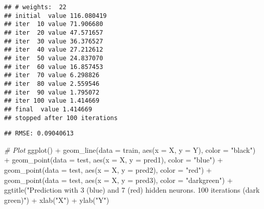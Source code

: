 \documentclass[
]{article}
\newenvironment{Shaded}{\begin{snugshade}}{\end{snugshade}}
\newcommand{\AttributeTok}[1]{\textcolor[rgb]{0.77,0.63,0.00}{#1}}
\newcommand{\CommentTok}[1]{\textcolor[rgb]{0.56,0.35,0.01}{\textit{#1}}}
\newcommand{\DecValTok}[1]{\textcolor[rgb]{0.00,0.00,0.81}{#1}}
\newcommand{\FunctionTok}[1]{\textcolor[rgb]{0.00,0.00,0.00}{#1}}
\newcommand{\NormalTok}[1]{#1}
\newcommand{\OtherTok}[1]{\textcolor[rgb]{0.56,0.35,0.01}{#1}}
\newcommand{\SpecialCharTok}[1]{\textcolor[rgb]{0.00,0.00,0.00}{#1}}
\newcommand{\StringTok}[1]{\textcolor[rgb]{0.31,0.60,0.02}{#1}}
\begin{document}
\begin{verbatim}
## # weights:  22
## initial  value 116.080419 
## iter  10 value 71.906680
## iter  20 value 47.571657
## iter  30 value 36.376527
## iter  40 value 27.212612
## iter  50 value 24.837070
## iter  60 value 16.857453
## iter  70 value 6.298826
## iter  80 value 2.559546
## iter  90 value 1.795072
## iter 100 value 1.414669
## final  value 1.414669 
## stopped after 100 iterations
\end{verbatim}

\begin{Shaded}
\end{Shaded}

\begin{verbatim}
## RMSE: 0.09040613
\end{verbatim}

\begin{Shaded}
\begin{Highlighting}[]
\CommentTok{\# Plot}
\FunctionTok{ggplot}\NormalTok{() }\SpecialCharTok{+} 
  \FunctionTok{geom\_line}\NormalTok{(}\AttributeTok{data =}\NormalTok{ train, }\FunctionTok{aes}\NormalTok{(}\AttributeTok{x =}\NormalTok{ X, }\AttributeTok{y =}\NormalTok{ Y), }\AttributeTok{color =} \StringTok{"black"}\NormalTok{) }\SpecialCharTok{+}
  \FunctionTok{geom\_point}\NormalTok{(}\AttributeTok{data =}\NormalTok{ test, }\FunctionTok{aes}\NormalTok{(}\AttributeTok{x =}\NormalTok{ X, }\AttributeTok{y =}\NormalTok{ pred1), }\AttributeTok{color =} \StringTok{"blue"}\NormalTok{) }\SpecialCharTok{+}
  \FunctionTok{geom\_point}\NormalTok{(}\AttributeTok{data =}\NormalTok{ test, }\FunctionTok{aes}\NormalTok{(}\AttributeTok{x =}\NormalTok{ X, }\AttributeTok{y =}\NormalTok{ pred2), }\AttributeTok{color =} \StringTok{"red"}\NormalTok{) }\SpecialCharTok{+}
  \FunctionTok{geom\_point}\NormalTok{(}\AttributeTok{data =}\NormalTok{ test, }\FunctionTok{aes}\NormalTok{(}\AttributeTok{x =}\NormalTok{ X, }\AttributeTok{y =}\NormalTok{ pred3), }\AttributeTok{color =} \StringTok{"darkgreen"}\NormalTok{) }\SpecialCharTok{+}
  \FunctionTok{ggtitle}\NormalTok{(}\StringTok{"Prediction with 3 (blue) and 7 (red) hidden neurons. 100 iterations (dark green)"}\NormalTok{) }\SpecialCharTok{+}
  \FunctionTok{xlab}\NormalTok{(}\StringTok{"X"}\NormalTok{) }\SpecialCharTok{+} \FunctionTok{ylab}\NormalTok{(}\StringTok{"Y"}\NormalTok{)}
\end{Highlighting}
\end{Shaded}
\end{document}
